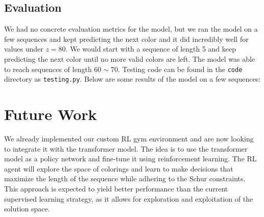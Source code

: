 \documentclass[12pt]{article}
\begin{document}
\subsection{Evaluation}
We had no concrete evaluation metrics for the model, but we ran the model on a few sequences and kept predicting the next color and it did incredibly well for values under $z = 80$. We would start with a sequence of length 5 and keep predicting the next color until no more valid colors are left. The model was able to reach sequences of length $60\sim70$. Testing code can be found in the \texttt{code} directory as \texttt{testing.py}.
Below are some results of the model on a few sequences:


\section{Future Work}
We already implemented our custom RL gym environment and are now looking to integrate it with the transformer model. The idea is to use the transformer model as a policy network and fine-tune it using reinforcement learning. The RL agent will explore the space of colorings and learn to make decisions that maximize the length of the sequence while adhering to the Schur constraints. This approach is expected to yield better performance than the current supervised learning strategy, as it allows for exploration and exploitation of the solution space. 
\end{document}
